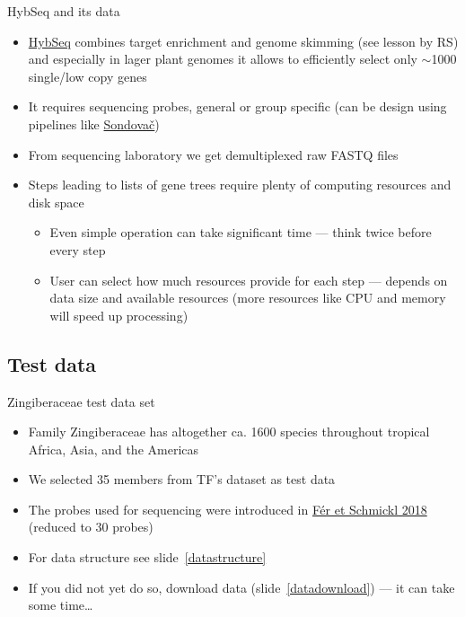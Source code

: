 \documentclass[compress,  xelatex, 11pt, xcolor=x11names, aspectratio=169,
	hyperref={
		bookmarks=true,
		unicode=true,
		colorlinks=true,
		pdftitle={HybSeq course},
		plainpages=false,
		pdfauthor={Vojtech Zeisek},
		pdfsubject={Practical processing of HybSeq target enrichment sequencing data on computing grids like MetaCentrum},
		pdfcreator={XeLaTeX},
		pdfkeywords={BASH, command line, GNU, HybSeq, Linux, MetaCentrum, sequencing shell, target enrichment},
		linkcolor=Turquoise4, %
		anchorcolor=DodgerBlue4, %
		citecolor=DodgerBlue4, %
		filecolor=DodgerBlue4, %
		menucolor=Tan4, %
		urlcolor=DarkOliveGreen4 %
		},
	url={hyphens, lowtilde} %
	]{beamer}
\begin{document}
\begin{frame}{HybSeq and its data}
	\begin{itemize}
		\item \href{https://bsapubs.onlinelibrary.wiley.com/doi/full/10.3732/apps.1400042}{HybSeq} combines target enrichment and genome skimming (see lesson by RS) and especially in lager plant genomes it allows to efficiently select only $\sim$1000 single/low copy genes
		\item It requires sequencing probes, general or group specific (can be design using pipelines like \href{https://github.com/V-Z/sondovac/wiki}{Sondovač})
		\item From sequencing laboratory we get demultiplexed raw FASTQ files
		\item Steps leading to lists of gene trees require plenty of computing resources and disk space
		\begin{itemize}
			\item Even simple operation can take significant time --- think twice before every step
			\item User can select how much resources provide for each step --- depends on data size and available resources (more resources like CPU and memory will speed up processing)
		\end{itemize}
	\end{itemize}
\end{frame}

\subsection{Test data}

\begin{frame}{Zingiberaceae test data set}
	\begin{itemize}
		\item Family Zingiberaceae has altogether ca. 1600 species throughout tropical Africa, Asia, and the Americas
		\item We selected 35 members from TF's dataset as test data
		\item The probes used for sequencing were introduced in \href{https://journals.sagepub.com/doi/full/10.1177/1176934317742613}{Fér et Schmickl 2018} (reduced to 30 probes)
		\item For data structure see slide~\ref{datastructure}
		\item If you did not yet do so, download data (slide~\ref{datadownload}) --- it can take some time\ldots
	\end{itemize}
\end{frame}
\end{document}
